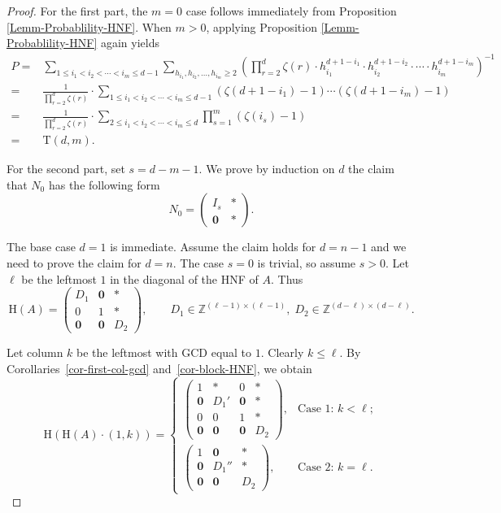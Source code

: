 \documentclass[reqno, 12pt]{article}
\theoremstyle{mydefinition}
\theoremstyle{myremark}
\numberwithin{algorithm}{section}
\newcommand{\h}{{\mathrm{H}}}
\begin{document}
\begin{proof}
For the first part, the $m=0$ case follows immediately from Proposition \ref{Lemm-Probablility-HNF}.
When $m>0$, applying Proposition \ref{Lemm-Probablility-HNF} again yields
\begin{align*}
P= &\sum_{1\leq i_1<i_2<\cdots <i_m\leq d-1} \sum_{h_{i_1}, h_{i_2},\ldots,h_{i_m}\geq 2}
\left(\prod_{r=2}^d \zeta(r) \cdot h_{i_1}^{d+1-i_1} \cdot h_{i_2}^{d+1-i_2} \cdot \cdots \cdot h_{i_m}^{d+1-i_m}\right)^{-1}
\\= & \frac{1}{\prod_{r=2}^d \zeta(r)} \cdot \sum_{1\leq i_1<i_2<\cdots <i_m\leq d-1} (\zeta(d+1-i_1)-1)\cdots (\zeta(d+1-i_m)-1)
\\=& \frac{1}{\prod_{r=2}^d \zeta(r)} \cdot \sum_{2\leq i_1<i_2<\cdots < i_m\leq d} \prod_{s=1}^m (\zeta(i_s)-1)
\\=&\mathrm{T}(d,m).
\end{align*}

For the second part, set $s = d - m - 1$. We prove by induction on $d$ the claim that $N_0$ has the following form
\[
N_0 = \begin{pmatrix}
       I_{s} & * \\
       \mathbf{0} & *
    \end{pmatrix}.
\]

The base case $d = 1$ is immediate. Assume the claim holds for $d=n-1$ and we need to prove the claim for $d=n$.
The case $s=0$ is trivial, so assume $s>0$. Let $\ell$ be the leftmost $1$ in the diagonal of the HNF of $A$. Thus
\[
\h(A)= \begin{pmatrix}
          D_1 & \mathbf{0}  & * \\
          0 & 1 & * \\
          \mathbf{0} & \mathbf0 & D_2
       \end{pmatrix},
\qquad D_1 \in \mathbb{Z}^{(\ell-1)\times (\ell-1)},\;
       D_2 \in \mathbb{Z}^{(d-\ell)\times (d-\ell)}.\]

Let column $k$ be the leftmost with GCD  equal to $1$. Clearly $k\leq \ell$.
By Corollaries~\ref{cor-first-col-gcd} and~\ref{cor-block-HNF}, we obtain
\[
\h(\h(A)\cdot (1,k)) =
\begin{cases}
\begin{pmatrix}
  1 & * & 0 & * \\
  \mathbf{0} & D_1' & \mathbf0& * \\
  0 & 0 & 1 & * \\
  \mathbf 0 & \mathbf0 & \mathbf0 & D_2
\end{pmatrix}, & \text{Case 1: } k<\ell; \\[3ex]
\begin{pmatrix}
  1 & \mathbf{0} & * \\
  \mathbf0 & D_1'' & * \\
  \mathbf0 & \mathbf{0} & D_2
\end{pmatrix}, & \text{Case 2: } k=\ell.
\end{cases}
\]


\end{proof}
\end{document}
